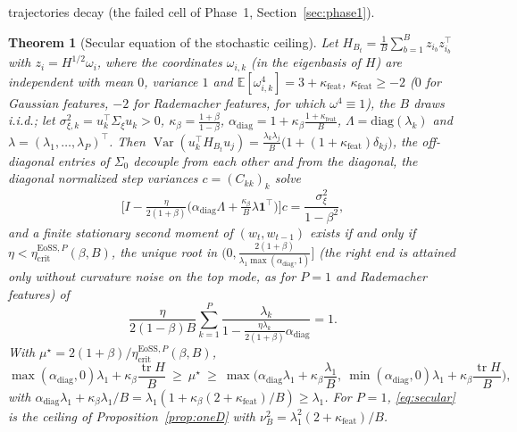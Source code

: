\documentclass[11pt]{article}
\newtheorem{theorem}{Theorem}
\theoremstyle{remark}
\newcommand{\etacrit}{\eta_{\mathrm{crit}}}
\newcommand{\E}{\mathbb{E}}
\newcommand{\Var}{\operatorname{Var}}
\newcommand{\tr}{\operatorname{tr}}
\begin{document}
trajectories decay (the failed cell of Phase~1, Section~\ref{sec:phase1}).

\begin{theorem}[Secular equation of the stochastic ceiling]\label{thm:G}
Let $H_{B_t}=\frac1B\sum_{b=1}^Bz_{i_b}z_{i_b}^\top$ with $z_i=H^{1/2}\omega_i$, where the coordinates $\omega_{i,k}$ (in the eigenbasis of $H$) are independent with mean $0$, variance $1$ and $\E[\omega_{i,k}^4]=3+\kappa_{\mathrm{feat}}$, $\kappa_{\mathrm{feat}}\ge-2$ ($0$ for Gaussian features, $-2$ for Rademacher features, for which $\omega^4\equiv1$), the $B$ draws i.i.d.; let $\sigma_{\xi,k}^2=u_k^\top\Sigma_\xi u_k>0$, $\kappa_\beta=\frac{1+\beta}{1-\beta}$, $\alpha_{\mathrm{diag}}=1+\kappa_\beta\frac{1+\kappa_{\mathrm{feat}}}{B}$, $\Lambda=\mathrm{diag}(\lambda_k)$ and $\lambda=(\lambda_1,\dots,\lambda_P)^\top$. Then $\Var(u_k^\top H_{B_t}u_j)=\frac{\lambda_k\lambda_j}{B}\big(1+(1+\kappa_{\mathrm{feat}})\delta_{kj}\big)$, the off-diagonal entries of $\Sigma_0$ decouple from each other and from the diagonal, the diagonal normalized step variances $c=(C_{kk})_k$ solve
\begin{equation}\label{eq:mmatrix}
\Big[I-\tfrac{\eta}{2(1+\beta)}\big(\alpha_{\mathrm{diag}}\Lambda+\tfrac{\kappa_\beta}{B}\lambda\mathbf 1^\top\big)\Big]c=\frac{\sigma_\xi^2}{1-\beta^2},
\end{equation}
and a finite stationary second moment of $(w_t,w_{t-1})$ exists if and only if $\eta<\etacrit^{\mathrm{EoSS},P}(\beta,B)$, the unique root in $\big(0,\frac{2(1+\beta)}{\lambda_1\max(\alpha_{\mathrm{diag}},1)}\big]$ (the right end is attained only without curvature noise on the top mode, as for $P=1$ and Rademacher features) of
\begin{equation}\label{eq:secular}
\frac{\eta}{2(1-\beta)B}\sum_{k=1}^P\frac{\lambda_k}{1-\frac{\eta\lambda_k}{2(1+\beta)}\alpha_{\mathrm{diag}}}=1 .
\end{equation}
With $\mu^\star=2(1+\beta)/\etacrit^{\mathrm{EoSS},P}(\beta,B)$,
\begin{equation}\label{eq:sandwich}
\max(\alpha_{\mathrm{diag}},0)\lambda_1+\kappa_\beta\frac{\tr H}{B}\ \ge\ \mu^\star\ \ge\ \max\Big(\alpha_{\mathrm{diag}}\lambda_1+\kappa_\beta\frac{\lambda_1}{B},\ \min(\alpha_{\mathrm{diag}},0)\lambda_1+\kappa_\beta\frac{\tr H}{B}\Big),
\end{equation}
with $\alpha_{\mathrm{diag}}\lambda_1+\kappa_\beta\lambda_1/B=\lambda_1(1+\kappa_\beta(2+\kappa_{\mathrm{feat}})/B)\ge\lambda_1$. For $P=1$, \eqref{eq:secular} is the ceiling of Proposition~\ref{prop:oneD} with $\nu_B^2=\lambda_1^2(2+\kappa_{\mathrm{feat}})/B$.
\end{theorem}
\end{document}
